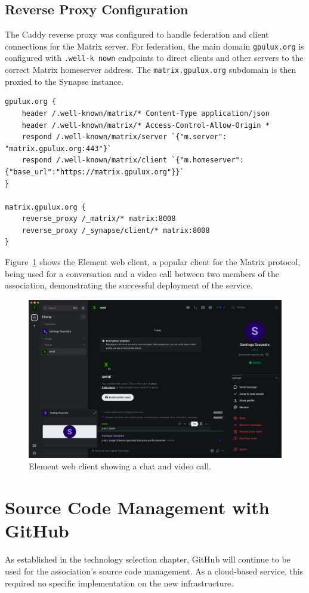\subsection*{Reverse Proxy Configuration}

The Caddy reverse proxy was configured to handle federation and client connections for the Matrix server. For federation, the main domain \texttt{gpulux.org} is configured with \texttt{.well-k nown} endpoints to direct clients and other servers to the correct Matrix homeserver address. The \texttt{matrix.gpulux.org} subdomain is then proxied to the Synapse instance.

\begin{lstlisting}[caption={Caddyfile configuration for Matrix Synapse.}]
gpulux.org {
    header /.well-known/matrix/* Content-Type application/json
    header /.well-known/matrix/* Access-Control-Allow-Origin *
    respond /.well-known/matrix/server `{"m.server": "matrix.gpulux.org:443"}`
    respond /.well-known/matrix/client `{"m.homeserver":{"base_url":"https://matrix.gpulux.org"}}`
}

matrix.gpulux.org {
    reverse_proxy /_matrix/* matrix:8008
    reverse_proxy /_synapse/client/* matrix:8008
}
\end{lstlisting}

Figure~\ref{fig:element-example} shows the Element web client, a popular client for the Matrix protocol, being used for a conversation and a video call between two members of the association, demonstrating the successful deployment of the service.

\begin{figure}[H]
	\centering
	\includegraphics[width=\textwidth]{imaxes/element-example.png}
	\caption{Element web client showing a chat and video call.}
	\label{fig:element-example}
\end{figure}

\section{Source Code Management with GitHub}

As established in the technology selection chapter, GitHub will continue to be used for the association's source code management. As a cloud-based service, this required no specific implementation on the new infrastructure.

